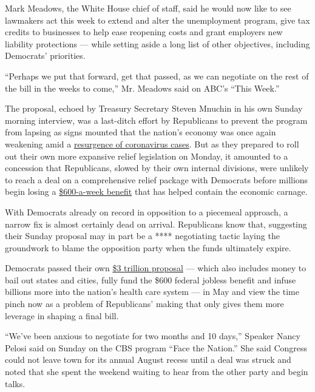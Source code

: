 Mark Meadows, the White House chief of staff, said he would now like to
see lawmakers act this week to extend and alter the unemployment
program, give tax credits to businesses to help ease reopening costs and
grant employers new liability protections --- while setting aside a long
list of other objectives, including Democrats' priorities.

``Perhaps we put that forward, get that passed, as we can negotiate on
the rest of the bill in the weeks to come,'' Mr. Meadows said on ABC's
``This Week.''

The proposal, echoed by Treasury Secretary Steven Mnuchin in his own
Sunday morning interview, was a last-ditch effort by Republicans to
prevent the program from lapsing as signs mounted that the nation's
economy was once again weakening amid a
\href{https://www.nytimes.com/interactive/2020/us/coronavirus-us-cases.html}{resurgence
of coronavirus cases}. But as they prepared to roll out their own more
expansive relief legislation on Monday, it amounted to a concession that
Republicans, slowed by their own internal divisions, were unlikely to
reach a deal on a comprehensive relief package with Democrats before
millions begin losing a
\href{https://www.nytimes.com/interactive/2020/07/24/business/economy/600-unemployment-benefits.html}{\$600-a-week
benefit} that has helped contain the economic carnage.

With Democrats already on record in opposition to a piecemeal approach,
a narrow fix is almost certainly dead on arrival. Republicans know that,
suggesting their Sunday proposal may in part be a **** negotiating
tactic laying the groundwork to blame the opposition party when the
funds ultimately expire.

Democrats passed their own
\href{https://www.nytimes.com/2020/05/15/us/politics/house-simulus-vote.html}{\$3
trillion proposal} --- which also includes money to bail out states and
cities, fully fund the \$600 federal jobless benefit and infuse billions
more into the nation's health care system --- in May and view the time
pinch now as a problem of Republicans' making that only gives them more
leverage in shaping a final bill.

``We've been anxious to negotiate for two months and 10 days,'' Speaker
Nancy Pelosi said on Sunday on the CBS program ``Face the Nation.'' She
said Congress could not leave town for its annual August recess until a
deal was struck and noted that she spent the weekend waiting to hear
from the other party and begin talks.


